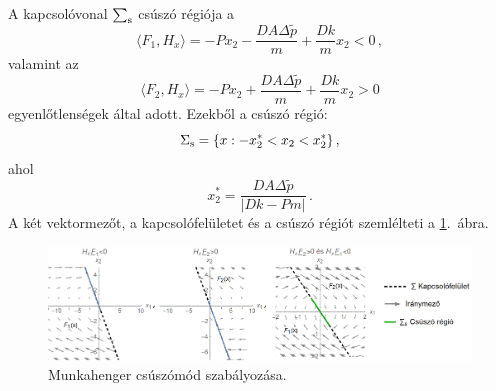 A kapcsolóvonal $\sum_{\rm s}$ csúszó régiója a
%
\begin{equation}
\langle F_1, H_x \rangle = -P x_2 - \frac{D A \Delta \tilde{p}}{m} + \frac{D k}{m} x_2 < 0 \,,
\end{equation}
%
\noindent valamint az
%
\begin{equation}
\langle F_2, H_x \rangle = -P x_2 + \frac{D A \Delta \tilde{p}}{m} + \frac{D k}{m} x_2 > 0
\end{equation} 
%
\noindent egyenlőtlenségek által adott. Ezekből a csúszó régió:
%
\begin{equation}
\Sigma_{\rm s} = \{x: -x_2^* < x_2 < x_2^* \} \,,
\end{equation}
%
\noindent ahol
%
\begin{equation} \label{eq:x2csillag}
x_2^* = \frac{D A \Delta \tilde{p}}{|D k - P m|} \,.
\end{equation}
%
\noindent A két vektormezőt, a kapcsolófelületet és a csúszó régiót szemlélteti a \ref{fig:csuszomod_szabalyozas}.~ábra.

\begin{figure}[ht]
\centering
\includegraphics[width=\textwidth]{graphics/sliding_region_PELDA.png}
\caption{Munkahenger csúszómód szabályozása.}
\label{fig:csuszomod_szabalyozas}
\end{figure}

